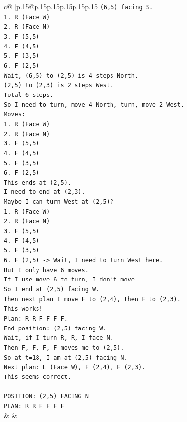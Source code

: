 \documentclass{article}
\begin{document}
{\begin{supertabular}{c@{$\;$}|p{.15\linewidth}@{}p{.15\linewidth}p{.15\linewidth}p{.15\linewidth}p{.15\linewidth}p{.15\linewidth}}
{{{\texttt{(6,5) facing S.} \\
\texttt{1. R (Face W)} \\
\texttt{2. R (Face N)} \\
\texttt{3. F (5,5)} \\
\texttt{4. F (4,5)} \\
\texttt{5. F (3,5)} \\
\texttt{6. F (2,5)} \\
\texttt{Wait, (6,5) to (2,5) is 4 steps North.} \\
\texttt{(2,5) to (2,3) is 2 steps West.} \\
\texttt{Total 6 steps.} \\
\texttt{So I need to turn, move 4 North, turn, move 2 West.} \\
\texttt{Moves:} \\
\texttt{1. R (Face W)} \\
\texttt{2. R (Face N)} \\
\texttt{3. F (5,5)} \\
\texttt{4. F (4,5)} \\
\texttt{5. F (3,5)} \\
\texttt{6. F (2,5)} \\
\texttt{This ends at (2,5).} \\
\texttt{I need to end at (2,3).} \\
\texttt{Maybe I can turn West at (2,5)?} \\
\texttt{1. R (Face W)} \\
\texttt{2. R (Face N)} \\
\texttt{3. F (5,5)} \\
\texttt{4. F (4,5)} \\
\texttt{5. F (3,5)} \\
\texttt{6. F (2,5) {-}> Wait, I need to turn West here.} \\
\texttt{But I only have 6 moves.} \\
\texttt{If I use move 6 to turn, I don't move.} \\
\texttt{So I end at (2,5) facing W.} \\
\texttt{Then next plan I move F to (2,4), then F to (2,3).} \\
\texttt{This works!} \\
\texttt{Plan: R R F F F F.} \\
\texttt{End position: (2,5) facing W.} \\
\texttt{Wait, if I turn R, R, I face N.} \\
\texttt{Then F, F, F, F moves me to (2,5).} \\
\texttt{So at t=18, I am at (2,5) facing N.} \\
\texttt{Next plan: L (Face W), F (2,4), F (2,3).} \\
\texttt{This seems correct.} \\
\\ 
\texttt{POSITION: (2,5) FACING N} \\
\texttt{PLAN: R R F F F F} \\
            }
        }
    }
    & & \\ \\


\end{supertabular}}
\end{document}
